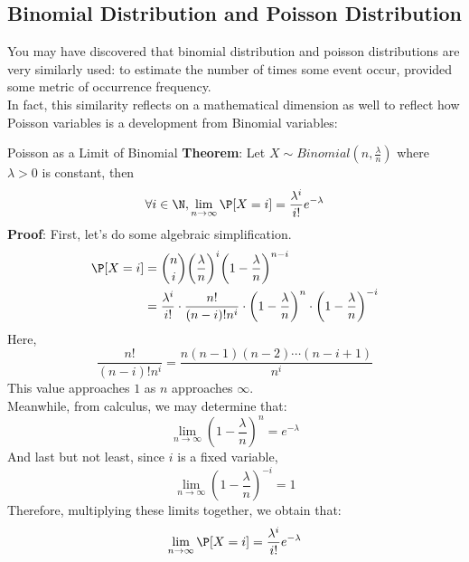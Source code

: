 \subsection{Binomial Distribution and Poisson Distribution}
You may have discovered that binomial distribution and poisson distributions are very similarly used: to estimate the number of times some event occur, provided some metric of occurrence frequency. \\
In fact, this similarity reflects on a mathematical dimension as well to reflect how Poisson variables is a development from Binomial variables:
\begin{ln-theorem}{Poisson as a Limit of Binomial}{}
    \textbf{Theorem}: Let $X \sim Binomial(n, \frac{\lambda}{n})$ where $\lambda > 0$ is constant, then
    \[\forall i \in \N, \lim_{n \rightarrow \infty}\P[X = i] = \frac{\lambda^i}{i!}e^{-\lambda}\]
    \tcblower
    \textbf{Proof}:
    First, let's do some algebraic simplification.
    \begin{align*}
        \P[X = i]
        &= \binom{n}{i} {\bigg( \frac{\lambda}{n} \bigg)}^i {\bigg( 1 - \frac{\lambda}{n} \bigg)}^{n - i} \\
        &= \frac{\lambda^i}{i!} \cdot \frac{n!}{(n - i)! n^i} \cdot {\bigg( 1 - \frac{\lambda}{n} \bigg)}^{n} \cdot {\bigg( 1 - \frac{\lambda}{n} \bigg)}^{-i}
    \end{align*}
    Here,
    \[\frac{n!}{(n - i)! n^i} = \frac{n (n - 1) (n - 2) \cdots (n - i + 1)}{n^i}\]
    This value approaches $1$ as $n$ approaches $\infty$. \\
    Meanwhile, from calculus, we may determine that:
    \[\lim_{n \rightarrow \infty} {(1 - \frac{\lambda}{n})}^n = e^{-\lambda}\]
    And last but not least, since $i$ is a fixed variable,
    \[\lim_{n \rightarrow \infty} {(1 - \frac{\lambda}{n})}^{-i} = 1\]
    Therefore, multiplying these limits together, we obtain that:
    \[\lim_{n \rightarrow \infty} \P[X = i] = \frac{\lambda^i}{i!}e^{-\lambda}\]
\end{ln-theorem}
